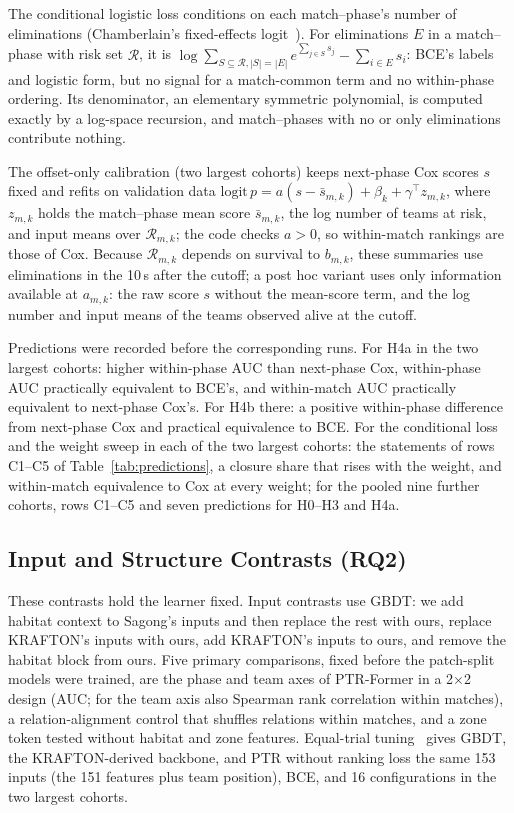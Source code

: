 \documentclass[sigconf,anonymous]{acmart}
\begin{document}
The conditional logistic loss conditions on each match--phase's number of eliminations (Chamberlain's fixed-effects logit~\cite{Chamberlain80}). For eliminations $E$ in a match--phase with risk set $\mathcal{R}$, it is $\log\sum_{S\subseteq\mathcal{R},|S|=|E|}e^{\sum_{j\in S}s_j}-\sum_{i\in E}s_i$: BCE's labels and logistic form, but no signal for a match-common term and no within-phase ordering. Its denominator, an elementary symmetric polynomial, is computed exactly by a log-space recursion, and match--phases with no or only eliminations contribute nothing.

The offset-only calibration (two largest cohorts) keeps next-phase Cox scores $s$ fixed and refits on validation data $\mathrm{logit}\,p=a(s-\bar s_{m,k})+\beta_k+\gamma^{\top}z_{m,k}$, where $z_{m,k}$ holds the match--phase mean score $\bar s_{m,k}$, the log number of teams at risk, and input means over $\mathcal{R}_{m,k}$; the code checks $a>0$, so within-match rankings are those of Cox. Because $\mathcal{R}_{m,k}$ depends on survival to $b_{m,k}$, these summaries use eliminations in the 10\,s after the cutoff; a post hoc variant uses only information available at $a_{m,k}$: the raw score $s$ without the mean-score term, and the log number and input means of the teams observed alive at the cutoff.

Predictions were recorded before the corresponding runs. For H4a in the two largest cohorts: higher within-phase AUC than next-phase Cox, within-phase AUC practically equivalent to BCE's, and within-match AUC practically equivalent to next-phase Cox's. For H4b there: a positive within-phase difference from next-phase Cox and practical equivalence to BCE. For the conditional loss and the weight sweep in each of the two largest cohorts: the statements of rows C1--C5 of Table~\ref{tab:predictions}, a closure share that rises with the weight, and within-match equivalence to Cox at every weight; for the pooled nine further cohorts, rows C1--C5 and seven predictions for H0--H3 and H4a.

\subsection{Input and Structure Contrasts (RQ2)}
\label{sec:method:contrasts}
These contrasts hold the learner fixed. Input contrasts use GBDT: we add habitat context to Sagong's inputs and then replace the rest with ours, replace KRAFTON's inputs with ours, add KRAFTON's inputs to ours, and remove the habitat block from ours. Five primary comparisons, fixed before the patch-split models were trained, are the phase and team axes of PTR-Former in a 2$\times$2 design (AUC; for the team axis also Spearman rank correlation within matches), a relation-alignment control that shuffles relations within matches, and a zone token tested without habitat and zone features. Equal-trial tuning~\cite{Bergstra12,Cawley10} gives GBDT, the KRAFTON-derived backbone, and PTR without ranking loss the same 153 inputs (the 151 features plus team position), BCE, and 16 configurations in the two largest cohorts.
\end{document}
